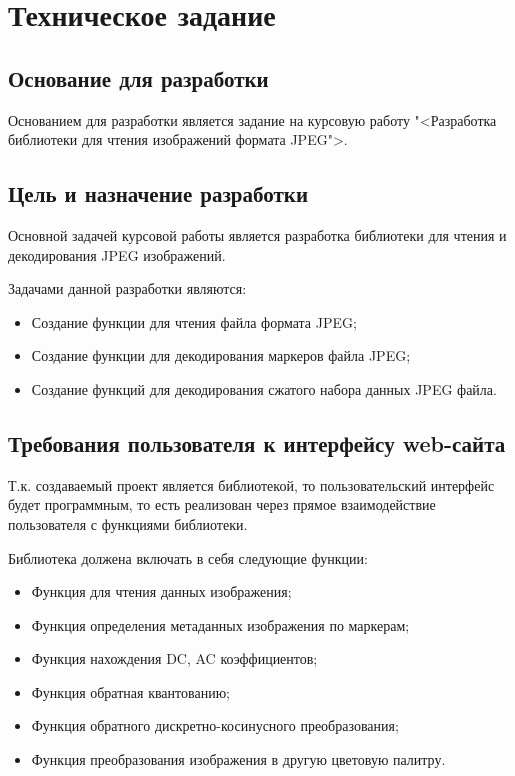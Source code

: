 \section{Техническое задание}
\subsection{Основание для разработки}

Основанием для разработки является задание на курсовую работу "<Разработка библиотеки для чтения изображений формата JPEG">.

\subsection{Цель и назначение разработки}

Основной задачей курсовой работы является разработка библиотеки для чтения и декодирования JPEG изображений.

Задачами данной разработки являются:
\begin{itemize}
\item Создание функции для чтения файла формата JPEG;
\item Создание функции для декодирования маркеров файла JPEG;
\item Создание функций для декодирования сжатого набора данных JPEG файла.
\end{itemize}

\subsection{Требования пользователя к интерфейсу web-сайта}

Т.к. создаваемый проект является библиотекой, то пользовательский интерфейс будет программным, то есть реализован через прямое взаимодействие пользователя с функциями библиотеки.

Библиотека должена включать в себя следующие функции:
\begin{itemize}
    \item Функция для чтения данных изображения;
    \item Функция определения метаданных изображения по маркерам;
    \item Функция нахождения DC, AC коэффициентов;
    \item Функция обратная квантованию;
    \item Функция обратного дискретно-косинусного преобразования;
    \item Функция преобразования изображения в другую цветовую палитру.
\end{itemize}


